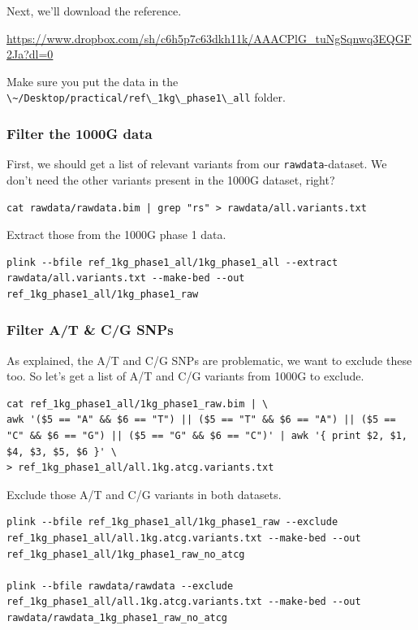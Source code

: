 \documentclass[
]{book}
\newcommand{\passthrough}[1]{#1}
\begin{document}
Next, we'll download the reference.

\url{https://www.dropbox.com/sh/c6h5p7c63dkh11k/AAACPlG_tuNgSqnwq3EQGF2Ja?dl=0}

Make sure you put the data in the \passthrough{\lstinline!\~/Desktop/practical/ref\_1kg\_phase1\_all!} folder.

\hypertarget{filter-the-1000g-data}{%
\subsubsection{Filter the 1000G data}\label{filter-the-1000g-data}}

First, we should get a list of relevant variants from our \passthrough{\lstinline!rawdata!}-dataset. We don't need the other variants present in the 1000G dataset, right?

\begin{lstlisting}
cat rawdata/rawdata.bim | grep "rs" > rawdata/all.variants.txt
\end{lstlisting}

Extract those from the 1000G phase 1 data.

\begin{lstlisting}
plink --bfile ref_1kg_phase1_all/1kg_phase1_all --extract rawdata/all.variants.txt --make-bed --out ref_1kg_phase1_all/1kg_phase1_raw
\end{lstlisting}

\hypertarget{filter-at-cg-snps}{%
\subsubsection{Filter A/T \& C/G SNPs}\label{filter-at-cg-snps}}

As explained, the A/T and C/G SNPs are problematic, we want to exclude these too. So let's get a list of A/T and C/G variants from 1000G to exclude.

\begin{lstlisting}
cat ref_1kg_phase1_all/1kg_phase1_raw.bim | \
awk '($5 == "A" && $6 == "T") || ($5 == "T" && $6 == "A") || ($5 == "C" && $6 == "G") || ($5 == "G" && $6 == "C")' | awk '{ print $2, $1, $4, $3, $5, $6 }' \
> ref_1kg_phase1_all/all.1kg.atcg.variants.txt
\end{lstlisting}

Exclude those A/T and C/G variants in both datasets.

\begin{lstlisting}
plink --bfile ref_1kg_phase1_all/1kg_phase1_raw --exclude ref_1kg_phase1_all/all.1kg.atcg.variants.txt --make-bed --out ref_1kg_phase1_all/1kg_phase1_raw_no_atcg

plink --bfile rawdata/rawdata --exclude ref_1kg_phase1_all/all.1kg.atcg.variants.txt --make-bed --out rawdata/rawdata_1kg_phase1_raw_no_atcg
\end{lstlisting}
\end{document}
